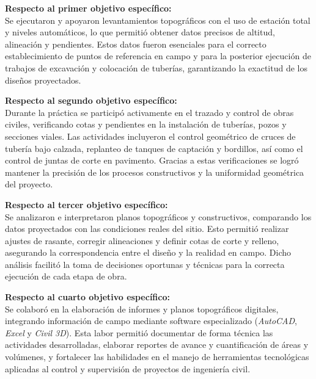 \documentclass[12pt]{article}
\begin{document}
	\vspace{0.3cm}
	\textbf{Respecto al primer objetivo específico:} \\
	Se ejecutaron y apoyaron levantamientos topográficos con el uso de estación total y niveles automáticos, lo que permitió obtener datos precisos de altitud, alineación y pendientes. Estos datos fueron esenciales para el correcto establecimiento de puntos de referencia en campo y para la posterior ejecución de trabajos de excavación y colocación de tuberías, garantizando la exactitud de los diseños proyectados.
	
	\vspace{0.3cm}
	\textbf{Respecto al segundo objetivo específico:} \\
	Durante la práctica se participó activamente en el trazado y control de obras civiles, verificando cotas y pendientes en la instalación de tuberías, pozos y secciones viales. Las actividades incluyeron el control geométrico de cruces de tubería bajo calzada, replanteo de tanques de captación y bordillos, así como el control de juntas de corte en pavimento. Gracias a estas verificaciones se logró mantener la precisión de los procesos constructivos y la uniformidad geométrica del proyecto.
	
	\vspace{0.3cm}
	\textbf{Respecto al tercer objetivo específico:} \\
	Se analizaron e interpretaron planos topográficos y constructivos, comparando los datos proyectados con las condiciones reales del sitio. Esto permitió realizar ajustes de rasante, corregir alineaciones y definir cotas de corte y relleno, asegurando la correspondencia entre el diseño y la realidad en campo. Dicho análisis facilitó la toma de decisiones oportunas y técnicas para la correcta ejecución de cada etapa de obra.
	
	\vspace{0.3cm}
	\textbf{Respecto al cuarto objetivo específico:} \\
	Se colaboró en la elaboración de informes y planos topográficos digitales, integrando información de campo mediante software especializado (\textit{AutoCAD}, \textit{Excel} y \textit{Civil 3D}). Esta labor permitió documentar de forma técnica las actividades desarrolladas, elaborar reportes de avance y cuantificación de áreas y volúmenes, y fortalecer las habilidades en el manejo de herramientas tecnológicas aplicadas al control y supervisión de proyectos de ingeniería civil.
	
	
	
\end{document}
